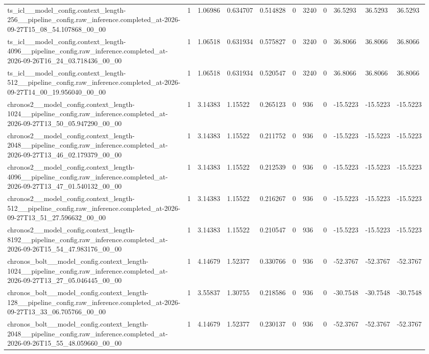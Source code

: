 \begin{tabular}{lllllllllll}
ts\_icl\_\_model\_config.context\_length-256\_\_pipeline\_config.raw\_inference.completed\_at-2026-09-27T15\_08\_54.107868\_00\_00 & 1 & 1.06986 & 0.634707 & 0.514828 & 0 & 3240 & 0 & 36.5293 & 36.5293 & 36.5293 \\
ts\_icl\_\_model\_config.context\_length-4096\_\_pipeline\_config.raw\_inference.completed\_at-2026-09-26T16\_24\_03.718436\_00\_00 & 1 & 1.06518 & 0.631934 & 0.575827 & 0 & 3240 & 0 & 36.8066 & 36.8066 & 36.8066 \\
ts\_icl\_\_model\_config.context\_length-512\_\_pipeline\_config.raw\_inference.completed\_at-2026-09-27T14\_00\_19.956040\_00\_00 & 1 & 1.06518 & 0.631934 & 0.520547 & 0 & 3240 & 0 & 36.8066 & 36.8066 & 36.8066 \\
chronos2\_\_model\_config.context\_length-1024\_\_pipeline\_config.raw\_inference.completed\_at-2026-09-27T13\_50\_05.947290\_00\_00 & 1 & 3.14383 & 1.15522 & 0.265123 & 0 & 936 & 0 & -15.5223 & -15.5223 & -15.5223 \\
chronos2\_\_model\_config.context\_length-2048\_\_pipeline\_config.raw\_inference.completed\_at-2026-09-27T13\_46\_02.179379\_00\_00 & 1 & 3.14383 & 1.15522 & 0.211752 & 0 & 936 & 0 & -15.5223 & -15.5223 & -15.5223 \\
chronos2\_\_model\_config.context\_length-4096\_\_pipeline\_config.raw\_inference.completed\_at-2026-09-27T13\_47\_01.540132\_00\_00 & 1 & 3.14383 & 1.15522 & 0.212539 & 0 & 936 & 0 & -15.5223 & -15.5223 & -15.5223 \\
chronos2\_\_model\_config.context\_length-512\_\_pipeline\_config.raw\_inference.completed\_at-2026-09-27T13\_51\_27.596632\_00\_00 & 1 & 3.14383 & 1.15522 & 0.216267 & 0 & 936 & 0 & -15.5223 & -15.5223 & -15.5223 \\
chronos2\_\_model\_config.context\_length-8192\_\_pipeline\_config.raw\_inference.completed\_at-2026-09-26T15\_54\_47.983176\_00\_00 & 1 & 3.14383 & 1.15522 & 0.210547 & 0 & 936 & 0 & -15.5223 & -15.5223 & -15.5223 \\
chronos\_bolt\_\_model\_config.context\_length-1024\_\_pipeline\_config.raw\_inference.completed\_at-2026-09-27T13\_27\_05.046445\_00\_00 & 1 & 4.14679 & 1.52377 & 0.330766 & 0 & 936 & 0 & -52.3767 & -52.3767 & -52.3767 \\
chronos\_bolt\_\_model\_config.context\_length-128\_\_pipeline\_config.raw\_inference.completed\_at-2026-09-27T13\_33\_06.705766\_00\_00 & 1 & 3.55837 & 1.30755 & 0.218586 & 0 & 936 & 0 & -30.7548 & -30.7548 & -30.7548 \\
chronos\_bolt\_\_model\_config.context\_length-2048\_\_pipeline\_config.raw\_inference.completed\_at-2026-09-26T15\_55\_48.059660\_00\_00 & 1 & 4.14679 & 1.52377 & 0.230137 & 0 & 936 & 0 & -52.3767 & -52.3767 & -52.3767 \\

\end{tabular}
